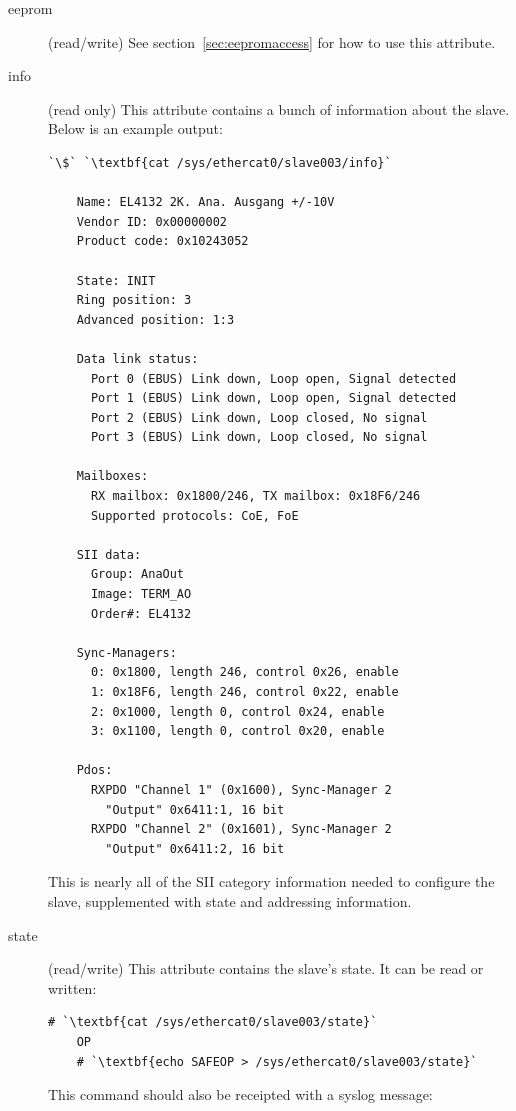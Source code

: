 \documentclass[a4paper,12pt,BCOR6mm,bibtotoc,idxtotoc]{scrbook}
\begin{document}
\begin{description}
\item[eeprom] (read/write) See section~\ref{sec:eepromaccess} for how
  to use this attribute.

\item[info] (read only) This attribute contains a bunch of information
  about the slave. Below is an example output:

  \begin{lstlisting}[gobble=4]
    `\$` `\textbf{cat /sys/ethercat0/slave003/info}`

    Name: EL4132 2K. Ana. Ausgang +/-10V
    Vendor ID: 0x00000002
    Product code: 0x10243052

    State: INIT
    Ring position: 3
    Advanced position: 1:3

    Data link status:
      Port 0 (EBUS) Link down, Loop open, Signal detected
      Port 1 (EBUS) Link down, Loop open, Signal detected
      Port 2 (EBUS) Link down, Loop closed, No signal
      Port 3 (EBUS) Link down, Loop closed, No signal

    Mailboxes:
      RX mailbox: 0x1800/246, TX mailbox: 0x18F6/246
      Supported protocols: CoE, FoE

    SII data:
      Group: AnaOut
      Image: TERM_AO
      Order#: EL4132

    Sync-Managers:
      0: 0x1800, length 246, control 0x26, enable
      1: 0x18F6, length 246, control 0x22, enable
      2: 0x1000, length 0, control 0x24, enable
      3: 0x1100, length 0, control 0x20, enable

    Pdos:
      RXPDO "Channel 1" (0x1600), Sync-Manager 2
        "Output" 0x6411:1, 16 bit
      RXPDO "Channel 2" (0x1601), Sync-Manager 2
        "Output" 0x6411:2, 16 bit
  \end{lstlisting}

  This is nearly all of the SII category information needed to
  configure the slave, supplemented with state and addressing
  information.

\item[state] (read/write) This attribute contains the slave's state.
  It can be read or written:

  \begin{lstlisting}[gobble=4]
    # `\textbf{cat /sys/ethercat0/slave003/state}`
    OP
    # `\textbf{echo SAFEOP > /sys/ethercat0/slave003/state}`
  \end{lstlisting}

  This command should also be receipted with a syslog message:


\end{description}
\end{document}
